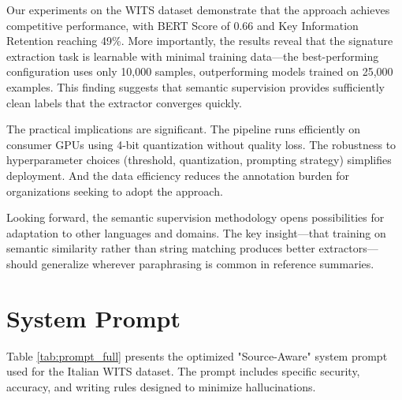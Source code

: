 \documentclass[conference]{IEEEtran}
\begin{document}
Our experiments on the WITS dataset demonstrate that the approach achieves competitive performance, with BERT Score of 0.66 and Key Information Retention reaching 49\%. More importantly, the results reveal that the signature extraction task is learnable with minimal training data---the best-performing configuration uses only 10,000 samples, outperforming models trained on 25,000 examples. This finding suggests that semantic supervision provides sufficiently clean labels that the extractor converges quickly.

The practical implications are significant. The pipeline runs efficiently on consumer GPUs using 4-bit quantization without quality loss. The robustness to hyperparameter choices (threshold, quantization, prompting strategy) simplifies deployment. And the data efficiency reduces the annotation burden for organizations seeking to adopt the approach.

Looking forward, the semantic supervision methodology opens possibilities for adaptation to other languages and domains. The key insight---that training on semantic similarity rather than string matching produces better extractors---should generalize wherever paraphrasing is common in reference summaries.

\appendices

\section{System Prompt}
Table \ref{tab:prompt_full} presents the optimized "Source-Aware" system prompt used for the Italian WITS dataset. The prompt includes specific security, accuracy, and writing rules designed to minimize hallucinations.
\end{document}
